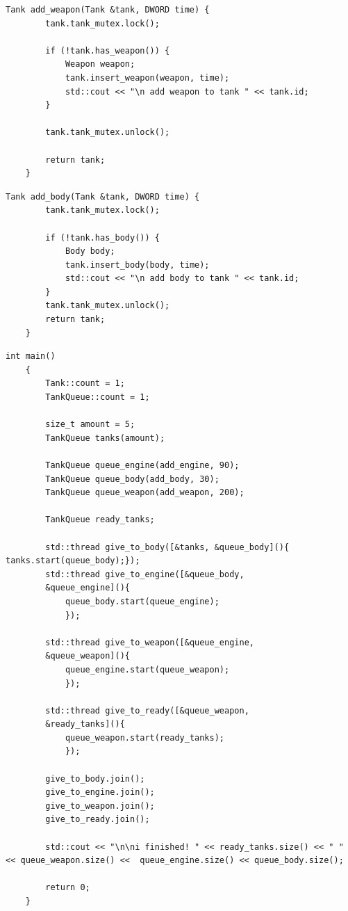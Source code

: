 \documentclass[a4paper, 14pt]{article}
\begin{document}
	\begin{lstlisting}[label=code:add_weapon,caption=Функция add\_weapon - встроить оружие.]
    Tank add_weapon(Tank &tank, DWORD time) {
        tank.tank_mutex.lock();
    
        if (!tank.has_weapon()) {
            Weapon weapon;
            tank.insert_weapon(weapon, time);
            std::cout << "\n add weapon to tank " << tank.id;
        }
    
        tank.tank_mutex.unlock();
    
        return tank;
    }
	\end{lstlisting}
	
	\begin{lstlisting}[label=code:add_body,caption=Функция add\_body - встроить корпус.]
      Tank add_body(Tank &tank, DWORD time) {
        tank.tank_mutex.lock();
    
        if (!tank.has_body()) {
            Body body;
            tank.insert_body(body, time);
            std::cout << "\n add body to tank " << tank.id;
        }
        tank.tank_mutex.unlock();
        return tank;
    }
	\end{lstlisting}
    
    \begin{lstlisting}[label=code:main,caption=Функция main.]
   int main()
    {
        Tank::count = 1;
        TankQueue::count = 1;
    
        size_t amount = 5;
        TankQueue tanks(amount);
    
        TankQueue queue_engine(add_engine, 90);
        TankQueue queue_body(add_body, 30);
        TankQueue queue_weapon(add_weapon, 200);
    
        TankQueue ready_tanks;
    
        std::thread give_to_body([&tanks, &queue_body](){ tanks.start(queue_body);});
        std::thread give_to_engine([&queue_body,
        &queue_engine](){
            queue_body.start(queue_engine);
            });
            
        std::thread give_to_weapon([&queue_engine,
        &queue_weapon](){
            queue_engine.start(queue_weapon);
            });
            
        std::thread give_to_ready([&queue_weapon,
        &ready_tanks](){
            queue_weapon.start(ready_tanks);
            });
    
        give_to_body.join();
        give_to_engine.join();
        give_to_weapon.join();
        give_to_ready.join();
        
        std::cout << "\n\ni finished! " << ready_tanks.size() << " " << queue_weapon.size() <<  queue_engine.size() << queue_body.size();
    
        return 0;
    }
	\end{lstlisting}
    
\end{document}
